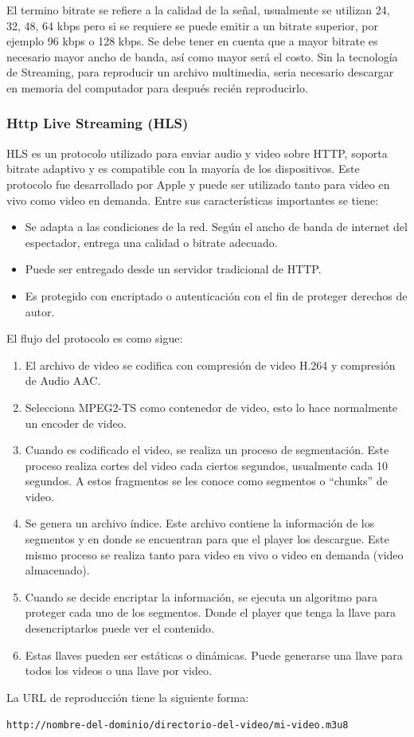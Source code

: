 El termino bitrate se refiere a la calidad de la señal, usualmente se utilizan 24, 32, 48, 64 kbps pero si se requiere se puede emitir a un bitrate superior, por ejemplo 96 kbps o 128 kbps. Se debe tener en cuenta que a mayor bitrate es necesario mayor ancho de banda, así como mayor será el costo. Sin la tecnología de Streaming, para reproducir un archivo multimedia, seria necesario descargar en memoria del computador para después recién reproducirlo.\\

\subsubsection{Http Live Streaming (HLS)}
HLS es un protocolo utilizado para enviar audio y video sobre HTTP, soporta bitrate adaptivo y es compatible con la mayoría de los dispositivos. Este protocolo fue desarrollado por Apple y puede ser utilizado tanto para video en vivo como video en demanda. Entre sus características importantes se tiene:

\begin{itemize}
    \item Se adapta a las condiciones de la red. Según el ancho de banda de internet del espectador, entrega una calidad o bitrate adecuado.
    \item Puede ser entregado desde un servidor tradicional de HTTP.
    \item Es protegido con encriptado o autenticación con el fin de proteger derechos de autor.
\end{itemize}

El flujo del protocolo es como sigue: 
\begin{enumerate}
    \item El archivo de video se codifica con compresión de video H.264 y compresión de Audio AAC.
    \item Selecciona MPEG2-TS como contenedor de video, esto lo hace normalmente un encoder de video.
    \item Cuando es codificado el video, se realiza un proceso de segmentación.  Este proceso realiza cortes del video cada ciertos segundos, usualmente cada 10 segundos. A estos fragmentos se les conoce como segmentos o ``chunks'' de video.
    \item Se genera un archivo índice. Este archivo contiene la información de los segmentos y en donde se encuentran para que el player los descargue. Este mismo proceso se realiza tanto para video en vivo o video en demanda (video almacenado).
    \item Cuando se decide encriptar la información, se ejecuta un algoritmo para proteger cada uno de los segmentos. Donde el player que tenga la llave para desencriptarlos puede ver el contenido.
    \item  Estas llaves pueden ser estáticas o dinámicas. Puede generarse una llave para todos los videos o una llave por video.
\end{enumerate}
La URL de reproducción tiene la siguiente forma:
\begin{center}
    \verb|http://nombre-del-dominio/directorio-del-video/mi-video.m3u8|    
\end{center}

